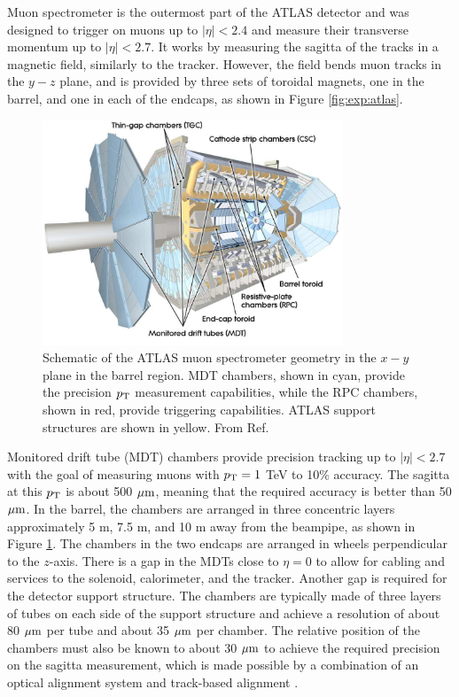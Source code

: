 Muon spectrometer is the outermost part of the ATLAS detector and was designed to
trigger on muons up to $|\eta| < 2.4$ and measure their transverse momentum up
to $|\eta| < 2.7$. It works by measuring the sagitta of the tracks
in a magnetic field, similarly to the tracker. However, the field
bends muon tracks in the $y-z$ plane, and is provided by three sets of
toroidal magnets, one in the barrel, and one in each of the endcaps,
as shown in Figure \ref{fig:exp:atlas}. 
\begin{figure}[h!]
  \centering
  \includegraphics[width=0.8\textwidth]{figures/experiment/muonspectrometer}
  \caption[The ATLAS muon spectrometer.]{Schematic of the ATLAS muon
  spectrometer geometry in the $x-y$ plane in the barrel region. MDT
  chambers, shown in cyan, provide the precision $p_{\text{T}}$ measurement
  capabilities, while the RPC chambers, shown in red, provide triggering
  capabilities. ATLAS support structures are shown in yellow.
  From Ref. \cite{Aad:2010ag}}
   \label{fig:exp:ms}
\end{figure}

Monitored drift tube (MDT) chambers provide precision tracking up to
$|\eta| < 2.7$ with the goal of measuring muons with $p_{\text{T}} = 1$ TeV
to 10\% accuracy. The sagitta at this $p_{\text{T}}$ is about 500 $\mu\text{m}$,
meaning that the required accuracy is better than 50 $\mu\text{m}$.
In the barrel, the chambers are arranged in three concentric
layers approximately 5 m, 7.5 m, and 10 m away from the beampipe, as
shown in Figure \ref{fig:exp:ms}. The chambers in the two endcaps are
arranged in wheels perpendicular to the $z$-axis. There is a gap in
the MDTs close to $\eta = 0$ to allow for cabling and services to
the solenoid, calorimeter, and the tracker. Another gap is required
for the detector support structure. The chambers are typically
made of three layers of tubes on each side of the support structure
and achieve a resolution of about 80 $\mu\text{m}$ per tube and about
35 $\mu\text{m}$ per chamber. The relative position of the chambers must also be
known to about 30 $\mu\text{m}$ to achieve the required precision on the sagitta
measurement, which is made possible by a combination of an optical alignment
system and track-based alignment \cite{Aad:2010ag, Aefsky:1380912, Aad:2008zzm}.

